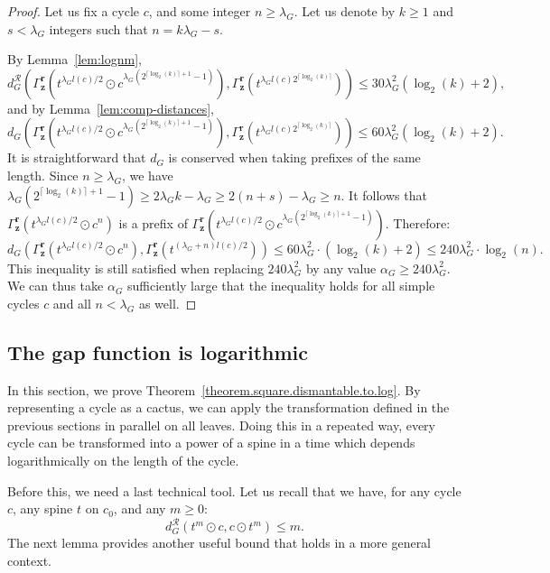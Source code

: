 \documentclass{article}
\begin{document}
\begin{proof}
Let us fix a cycle $c$, and some integer $n\ge \lambda_G$. Let us denote 
by $k \ge 1$ and $s<\lambda_G$ integers such that $n=k\lambda_G-s$.

By Lemma~\ref{lem:lognm}, 
\[
d_G^\mathcal{R}\left(\Gamma^{\textbf{r}}_\textbf{z}\left(t^{\lambda_G l(c)/2} \odot c^{\lambda_G (2^{\lceil \log_2(k) \rceil+1}-1)}\right), \Gamma^{\textbf{r}}_\textbf{z}\left(t^{\lambda_G l(c)2^{\lceil \log_2(k) \rceil}}\right)\right) \le { 30} \lambda_G ^2 (\log_2(k) + 2),
\]
and by Lemma~\ref{lem:comp-distances},
\[
d_G \left(\Gamma^{\textbf{r}}_\textbf{z}\left(t^{\lambda_G l(c)/2} \odot c^{\lambda_G (2^{\lceil \log_2(k) \rceil+1}-1)}\right), \Gamma^{\textbf{r}}_\textbf{z}\left(t^{\lambda_G l(c)2^{\lceil \log_2(k) \rceil}}\right)\right) \le { 60} \lambda_G ^2 (\log_2(k) + 2).
\]
It is straightforward that $d_G$ is conserved when taking prefixes of the same length. Since $n\ge \lambda_G$, we have $\lambda_G (2^{\lceil \log_2(k) \rceil+1}-1) \geq 2\lambda_G k - \lambda_G \geq 2(n+s) - \lambda_G \geq n$. It follows that
$\Gamma^{\textbf{r}}_\textbf{z}(t^{\lambda_G l(c)/2} \odot c^{n})$
is a prefix of
$\Gamma^{\textbf{r}}_\textbf{z}(t^{\lambda_G l(c)/2} \odot c^{\lambda_G (2^{\lceil \log_2(k) \rceil+1}-1)})$. Therefore:
\[d_G(\Gamma^{\textbf{r}}_\textbf{z}(t^{\lambda_G l(c)/2} \odot c^{n}), \Gamma^{\textbf{r}}_\textbf{z}(t^{(\lambda_G +n)l(c)/2}))\le {60} \lambda_G ^2 \cdot (\log_2(k)+2) \le 240 \lambda_G ^2 \cdot \log_2 (n).\]
This inequality is still satisfied when replacing $240 \lambda_G ^2$ by any value $\alpha_G \geq 240 \lambda_G ^2$. We can thus take $\alpha_G$ sufficiently large that the inequality holds for all simple cycles $c$ and all $n < \lambda_G$ as well.
\end{proof}

\subsection{The gap function is logarithmic\label{section.main.finite.cover}}

In this section, we prove Theorem~\ref{theorem.square.dismantable.to.log}. By representing a cycle as a cactus, we can apply the transformation defined in the previous sections in parallel on all leaves. Doing this in a repeated way, every cycle can be transformed into a power of a spine in a time which depends logarithmically on the length of the cycle. 

Before this, we need a last technical tool. Let us recall that we have, for any cycle $c$, any spine $t$ on $c_0$, and any $m \ge 0$: 
\[
d^{\mathcal{R}}_G(t^m \odot c,c \odot t^m) \le m.
\]
The next lemma provides another useful bound that holds in a more general context.
\end{document}
